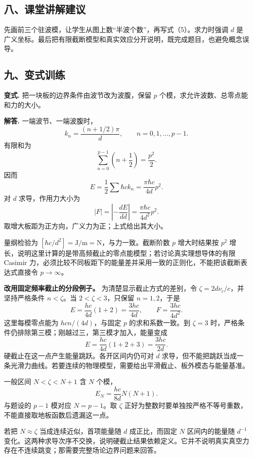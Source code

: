 \documentclass[12pt,a4paper,UTF8]{ctexart}
\begin{document}
\subsection{八、课堂讲解建议}\label{ux516bux8bfeux5802ux8bb2ux89e3ux5efaux8bae-7}

先画前三个驻波模，让学生从图上数``半波个数''，再写式（5）。求力时强调
\(d\)
是广义坐标。最后把有限截断模型和真实效应分开说明，既完成题目，也避免概念误导。

\subsection{九、变式训练}\label{ux4e5dux53d8ux5f0fux8badux7ec3-7}

\textbf{变式.} 把一块板的边界条件由波节改为波腹，保留 \(p\)
个模，求允许波数、总零点能和力的大小。

\textbf{解答.} 一端波节、一端波腹时， \[
\boxed{k_n=\frac{(n+1/2)\pi}{d}},
\qquad n=0,1,\ldots,p-1.
\] 有限和为 \[
\sum_{n=0}^{p-1}\left(n+\frac12\right)=\frac{p^2}{2}.
\] 因而 \[
E=\frac12\sum\hbar ck_n
=\boxed{\frac{\pi\hbar c}{4d}p^2}.
\] 对 \(d\) 求导，作用力大小为 \[
\boxed{|F|=\left|-\frac{dE}{dd}\right|
=\frac{\pi\hbar c}{4d^2}p^2}.
\] 取增大板距为正方向，广义力为正；上式给出其大小。

量纲检验为 \([\hbar c/d^2]=\mathrm{J/m}=\mathrm N\)，与力一致。截断阶数
\(p\) 增大时结果按 \(p^2\)
增长，说明这里计算的是带高频截止的零点能模型；若讨论真实理想导体的有限
Casimir
力，必须比较不同板距下的能量差并采用一致的正则化，不能把该截断表达式直接令
\(p\to\infty\)。

\textbf{改用固定频率截止的分段例子。} 为清楚显示截止方式的差别，令
\(\zeta=2d\nu_c/c\)，并坚持严格条件 \(n<\zeta\)。当
\(2<\zeta<3\)，只保留 \(n=1,2\)，于是 \[
E=\frac{hc}{4d}(1+2)=\frac{3hc}{4d},
\qquad F=\frac{3hc}{4d^2}.
\] 这里每模零点能为 \(hc n/(4d)\)，与固定 \(p\) 的求和系数一致。到
\(\zeta=3\) 时，严格条件仍排除第三模；刚越过三，第三模才加入，能量变成
\[
E=\frac{hc}{4d}(1+2+3)=\frac{3hc}{2d}.
\] 硬截止在这一点产生能量跳跃。各开区间内仍可对 \(d\)
求导，但不能把跳跃当成一条光滑力曲线。若要连续的物理模型，需要给出平滑截止、板外模态与能量基准。

一般区间 \(N<\zeta<N+1\) 含 \(N\) 个模， \[
E_N=\frac{hc}{8d}N(N+1).
\] 与题设的 \(p-1\) 模对应 \(N=p-1\)。取 \(\zeta\)
正好为整数时要单独按严格不等号重数，不能直接取地板函数后遗漏这一点。

若把 \(N\approx\zeta\) 当成连续近似，首项能量随 \(d\) 成正比，而固定
\(N\) 区间内的能量随 \(d^{-1}\)
变化。这两种求导次序不交换，说明硬截止结果依赖定义。它并不说明真实真空力存在不连续跳变；那需要完整场论边界问题来回答。
\end{document}
